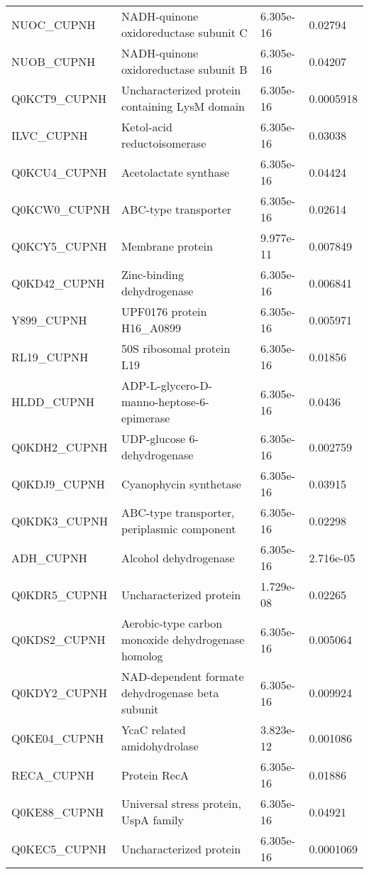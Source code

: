 \begin{center}
\begin{longtable}{ l l l l }
NUOC\_CUPNH & NADH-quinone oxidoreductase subunit C& 6.305e-16 & 0.02794 \\ [0.5ex]
NUOB\_CUPNH & NADH-quinone oxidoreductase subunit B& 6.305e-16 & 0.04207 \\ [0.5ex]
Q0KCT9\_CUPNH & Uncharacterized protein containing LysM domain& 6.305e-16 & 0.0005918 \\ [0.5ex]
ILVC\_CUPNH & Ketol-acid reductoisomerase& 6.305e-16 & 0.03038 \\ [0.5ex]
Q0KCU4\_CUPNH & Acetolactate synthase& 6.305e-16 & 0.04424 \\ [0.5ex]
Q0KCW0\_CUPNH & ABC-type transporter & 6.305e-16 & 0.02614 \\ [0.5ex]
Q0KCY5\_CUPNH & Membrane protein& 9.977e-11 & 0.007849 \\ [0.5ex]
Q0KD42\_CUPNH & Zinc-binding dehydrogenase& 6.305e-16 & 0.006841 \\ [0.5ex]
Y899\_CUPNH & UPF0176 protein H16\_A0899& 6.305e-16 & 0.005971 \\ [0.5ex]
RL19\_CUPNH & 50S ribosomal protein L19& 6.305e-16 & 0.01856 \\ [0.5ex]
HLDD\_CUPNH & ADP-L-glycero-D-manno-heptose-6-epimerase& 6.305e-16 & 0.0436 \\ [0.5ex]
Q0KDH2\_CUPNH & UDP-glucose 6-dehydrogenase& 6.305e-16 & 0.002759 \\ [0.5ex]
Q0KDJ9\_CUPNH & Cyanophycin synthetase& 6.305e-16 & 0.03915 \\ [0.5ex]
Q0KDK3\_CUPNH & ABC-type transporter, periplasmic component & 6.305e-16 & 0.02298 \\ [0.5ex]
ADH\_CUPNH & Alcohol dehydrogenase& 6.305e-16 & 2.716e-05 \\ [0.5ex]
Q0KDR5\_CUPNH & Uncharacterized protein& 1.729e-08 & 0.02265 \\ [0.5ex]
Q0KDS2\_CUPNH & Aerobic-type carbon monoxide dehydrogenase homolog & 6.305e-16 & 0.005064 \\ [0.5ex]
Q0KDY2\_CUPNH & NAD-dependent formate dehydrogenase beta subunit& 6.305e-16 & 0.009924 \\ [0.5ex]
Q0KE04\_CUPNH & YcaC related amidohydrolase& 3.823e-12 & 0.001086 \\ [0.5ex]
RECA\_CUPNH & Protein RecA& 6.305e-16 & 0.01886 \\ [0.5ex]
Q0KE88\_CUPNH & Universal stress protein, UspA family& 6.305e-16 & 0.04921 \\ [0.5ex]
Q0KEC5\_CUPNH & Uncharacterized protein& 6.305e-16 & 0.0001069 \\ [0.5ex]

\end{longtable}
\end{center}
